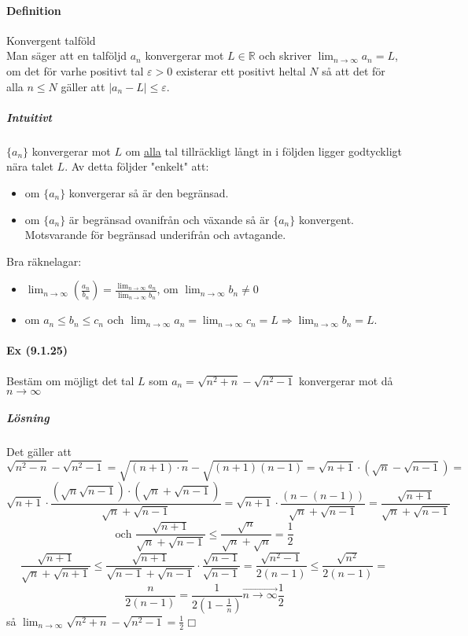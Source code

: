 \paragraph{Definition} Konvergent talföld\\
Man säger att en talföljd ${a_n}$ konvergerar mot $L\in\mathbb{R}$ och skriver $\lim_{n \to \infty}a_n=L$, om det för varhe positivt tal $\varepsilon > 0 $ existerar ett positivt heltal $N$ så att det för alla $n\leq N$ gäller att $|a_n-L|\leq\varepsilon$.
\subparagraph{Intuitivt} $\{a_n\}$ konvergerar mot $L$ om \underline{alla} tal tillräckligt långt in i följden ligger godtyckligt nära talet $L$.
Av detta följder "enkelt" att:
\begin{itemize}
    \item om $\{a_n\}$ konvergerar så är den begränsad.
    \item om $\{a_n\}$ är begränsad ovanifrån och växande så är $\{a_n\}$ konvergent.
          Motsvarande för begränsad underifrån och avtagande.
\end{itemize}
Bra räknelagar:
\begin{itemize}
    \item $\lim_{n \to \infty}(\frac{a_n}{b_n})=\frac{\lim_{n \to \infty}a_n}{\lim_{n \to \infty}b_n}$, om $\lim_{n \to \infty}b_n\neq 0$
    \item om $a_n\leq b_n\leq c_n$ och $\lim_{n \to \infty}a_n=\lim_{n \to \infty}c_n=L\Rightarrow \lim_{n \to \infty}b_n=L$.
\end{itemize}

\paragraph{Ex (9.1.25)} Bestäm om möjligt det tal $L$ som $a_n=\sqrt{n^2+n}-\sqrt{n^2-1}$ konvergerar mot då $n\to\infty$
\subparagraph{Lösning} Det gäller att
\begin{equation*}
    \sqrt{n^2-n}-\sqrt{n^2-1}=\sqrt{(n+1)\cdot n}-\sqrt{(n+1)(n-1)}=\sqrt{n+1}\cdot(\sqrt{n}-\sqrt{n-1})=
\end{equation*}
\begin{equation*}
    \sqrt{n+1}\cdot\frac{(\sqrt{n}\sqrt{n-1})\cdot(\sqrt{n}+\sqrt{n-1})}{\sqrt{n}+\sqrt{n-1}}=\sqrt{n+1}\cdot\frac{(n-(n-1))}{\sqrt{n}+\sqrt{n-1}}=\frac{\sqrt{n+1}}{\sqrt{n}+\sqrt{n-1}}
\end{equation*}
\begin{equation*}
    \text{och } \frac{\sqrt{n+1}}{\sqrt{n}+\sqrt{n-1}}\leq\frac{\sqrt{n}}{\sqrt{n}+\sqrt{n}}=\frac{1}{2}
\end{equation*}
\begin{equation*}
    \frac{\sqrt{n+1}}{\sqrt{n}+\sqrt{n+1}}\leq\frac{\sqrt{n+1}}{\sqrt{n-1}+\sqrt{n-1}}\cdot\frac{\sqrt{n-1}}{\sqrt{n-1}}=\frac{\sqrt{n^2-1}}{2(n-1)}\leq\frac{\sqrt{n^2}}{2(n-1)}=
\end{equation*}
\begin{equation*}
    \frac{n}{2(n-1)}=\frac{1}{2(1-\frac{1}{n})}\overrightarrow{n\to\infty}\frac{1}{2}
\end{equation*}
så $\lim_{n\to\infty}\sqrt{n^2+n}-\sqrt{n^2-1}=\frac{1}{2}\Box$
\\
